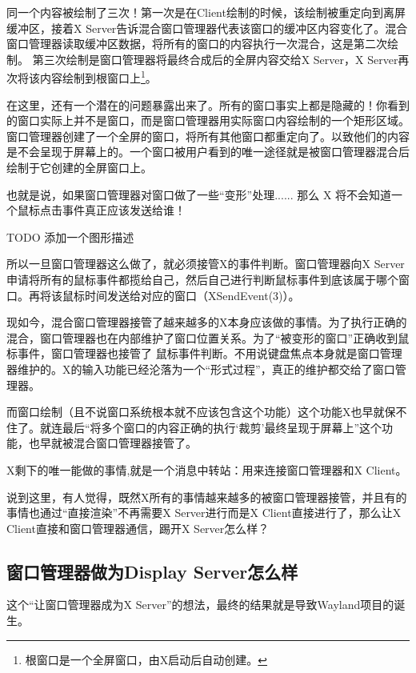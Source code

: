 同一个内容被绘制了三次！第一次是在Client绘制的时候，该绘制被重定向到离屏缓冲区，接着X Server告诉混合窗口管理器代表该窗口的缓冲区内容变化了。混合窗口管理器读取缓冲区数据，将所有的窗口的内容执行一次混合，这是第二次绘制。
第三次绘制是窗口管理器将最终合成后的全屏内容交给X Server，X Server再次将该内容绘制到根窗口上\footnote{根窗口是一个全屏窗口，由X启动后自动创建。}。

在这里，还有一个潜在的问题暴露出来了。所有的窗口事实上都是隐藏的！你看到的窗口实际上并不是窗口，而是窗口管理器用实际窗口内容绘制的一个矩形区域。
窗口管理器创建了一个全屏的窗口，将所有其他窗口都重定向了。以致他们的内容是不会呈现于屏幕上的。一个窗口被用户看到的唯一途径就是被窗口管理器混合后绘制于它创建的全屏窗口上。

也就是说，如果窗口管理器对窗口做了一些“变形”处理...... 那么 X 将不会知道一个鼠标点击事件真正应该发送给谁！

TODO 添加一个图形描述

所以一旦窗口管理器这么做了，就必须接管X的事件判断。窗口管理器向X Server申请将所有的鼠标事件都揽给自己，然后自己进行判断鼠标事件到底该属于哪个窗口。再将该鼠标时间发送给对应的窗口（XSendEvent(3)）。

现如今，混合窗口管理器接管了越来越多的X本身应该做的事情。为了执行正确的混合，窗口管理器也在内部维护了窗口位置关系。为了“被变形的窗口”正确收到鼠标事件，窗口管理器也接管了
鼠标事件判断。不用说键盘焦点本身就是窗口管理器维护的。X的输入功能已经沦落为一个“形式过程”，真正的维护都交给了窗口管理器。

而窗口绘制（且不说窗口系统根本就不应该包含这个功能）这个功能X也早就保不住了。就连最后“将多个窗口的内容正确的执行‘裁剪’最终呈现于屏幕上”这个功能，也早就被混合窗口管理器接管了。

X剩下的唯一能做的事情,就是一个消息中转站：用来连接窗口管理器和X Client。

说到这里，有人觉得，既然X所有的事情越来越多的被窗口管理器接管，并且有的事情也通过“直接渲染”不再需要X Server进行而是X Client直接进行了，那么让X Client直接和窗口管理器通信，踢开X Server怎么样？

\subsection{窗口管理器做为Display Server怎么样}

这个“让窗口管理器成为X Server”的想法，最终的结果就是导致Wayland项目的诞生。


